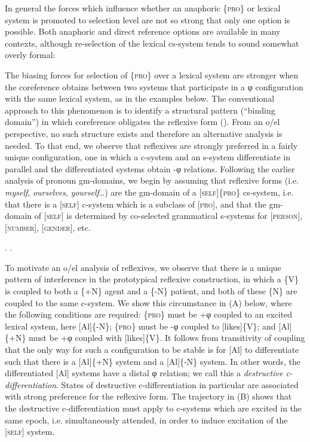 In general the forces which influence whether an anaphoric \{\textsc{pro}\} or lexical system is promoted to selection level are not so strong that only one option is possible. Both anaphoric and direct reference options are available in many contexts, although re-selection of the lexical cs-system tends to sound somewhat overly formal:

\ea
\z
\z

  The biasing forces for selection of \{\textsc{pro}\} over a lexical system are stronger when the coreference obtains between two systems that participate in a φ configuration with the same lexical system, as in the examples below. The conventional approach to this phenomenon is to identify a structural pattern (“binding domain”) in which coreference obligates the reflexive form (\citealt{Chomsky19821993,Haegeman1994,Reinhart1976,Safir2004}). From an o/el perspective, no such structure exists and therefore an alternative analysis is needed. To that end, we observe that reflexives are strongly preferred in a fairly unique configuration, one in which a c-system and an s-system differentiate in parallel and the differentiated systems obtain -φ relations. Following the earlier analysis of pronoun gm-domains, we begin by assuming that reflexive forms (i.e. \textit{myself}, \textit{ourselves}, \textit{yourself}…) are the gm-domain of a [\textsc{self}]\{\textsc{pro}\} cs-system, i.e. that there is a [\textsc{self}] c-system which is a subclass of [\textsc{pro}], and that the gm-domain of [\textsc{self}] is determined by co-selected grammatical s-systems for [\textsc{person}], [\textsc{number}], [\textsc{gender}], etc. 

\ea
{}.      
.        
\z
\z

  To motivate an o/el analysis of reflexives, we observe that there is a unique pattern of interference in the prototypical reflexive construction, in which a \{V\} is coupled to both a \{+N\} agent and a \{-N\} patient, and both of these \{N\} are coupled to the same c-system. We show this circumstance in (A) below, where the following conditions are required: \{\textsc{pro}\} must be +φ coupled to an excited lexical system, here [Al]\{-N\}; \{\textsc{pro}\} must be -φ coupled to [likes]\{V\}; and [Al]\{+N\} must be +φ coupled with [likes]\{V\}. It follows from transitivity of coupling that the only way for such a configuration to be stable is for [Al] to differentiate such that there is a [Al]\{+N\} system and a [Al]\{-N\} system. In other words, the differentiated [Al] systems have a distal φ relation; we call this a \textit{destructive c-differentiation}. States of destructive c-differentiation in particular are associated with strong preference for the reflexive form. The trajectory in (B) shows that the destructive c-differentiation must apply to c-systems which are excited in the same epoch, i.e. simultaneously attended, in order to induce excitation of the [\textsc{self}] system. 

